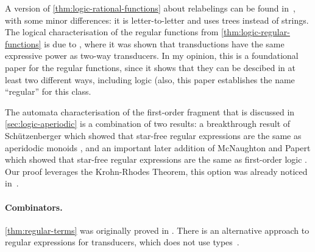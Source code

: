 A version of \cref{thm:logic-rational-functions} about \mso relabelings can be found in~\cite[Theorem 10]{bloemEngelfriet2000}, with some minor differences: it is letter-to-letter and uses trees instead of strings. The logical characterisation of the regular functions from \cref{thm:logic-regular-functions} is due to \cite{engelfrietHoogeboom2001}, where it was shown that \mso transductions have the same expressive power as two-way transducers. In my opinion, this is a foundational paper for the regular functions, since it shows that they can be descibed in at least two different ways, including  logic (also, this paper establishes the name ``regular'' for this class.

The automata characterisation of the first-order fragment that is discussed in \cref{sec:logic-aperiodic} is a combination of two results: a breakthrough result of Sch\"utzenberger which showed that star-free regular expressions are the same as aperidodic monoids \cite[Main Property]{Schutzenberger1965}, and an important later addition of McNaughton and Papert which showed that star-free regular expressions are the same as first-order logic \cite[Theorem 10.5]{McNaughtonPapert1971}. Our proof leverages the Krohn-Rhodes Theorem, this option was already noticed in~\cite[Footnote 1]{meyer1969}.

\paragraph*{Combinators.} \cref{thm:regular-terms} was originally proved in \cite[Theorem 6.1]{bojanczykDaviaudKrishna2018}. There is an alternative approach to regular expressions for transducers, which does not use types~\cite[Theorem 15]{alurFreilichRaghothaman2014}.